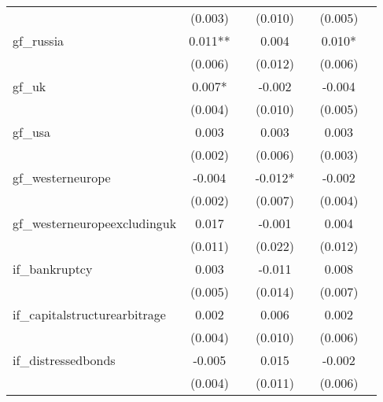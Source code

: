 {\begin{tabular}{l*{6}{c}}
            &     (0.003)   &               &     (0.010)   &               &     (0.005)   &               \\
[1em]
gf\_russia   &       0.011** &               &       0.004   &               &       0.010*  &               \\
            &     (0.006)   &               &     (0.012)   &               &     (0.006)   &               \\
[1em]
gf\_uk       &       0.007*  &               &      -0.002   &               &      -0.004   &               \\
            &     (0.004)   &               &     (0.010)   &               &     (0.005)   &               \\
[1em]
gf\_usa      &       0.003   &               &       0.003   &               &       0.003   &               \\
            &     (0.002)   &               &     (0.006)   &               &     (0.003)   &               \\
[1em]
gf\_westerneurope&      -0.004   &               &      -0.012*  &               &      -0.002   &               \\
            &     (0.002)   &               &     (0.007)   &               &     (0.004)   &               \\
[1em]
gf\_westerneuropeexcludinguk&       0.017   &               &      -0.001   &               &       0.004   &               \\
            &     (0.011)   &               &     (0.022)   &               &     (0.012)   &               \\
[1em]
if\_bankruptcy&       0.003   &               &      -0.011   &               &       0.008   &               \\
            &     (0.005)   &               &     (0.014)   &               &     (0.007)   &               \\
[1em]
if\_capitalstructurearbitrage&       0.002   &               &       0.006   &               &       0.002   &               \\
            &     (0.004)   &               &     (0.010)   &               &     (0.006)   &               \\
[1em]
if\_distressedbonds&      -0.005   &               &       0.015   &               &      -0.002   &               \\
            &     (0.004)   &               &     (0.011)   &               &     (0.006)   &               \\

\end{tabular}}
